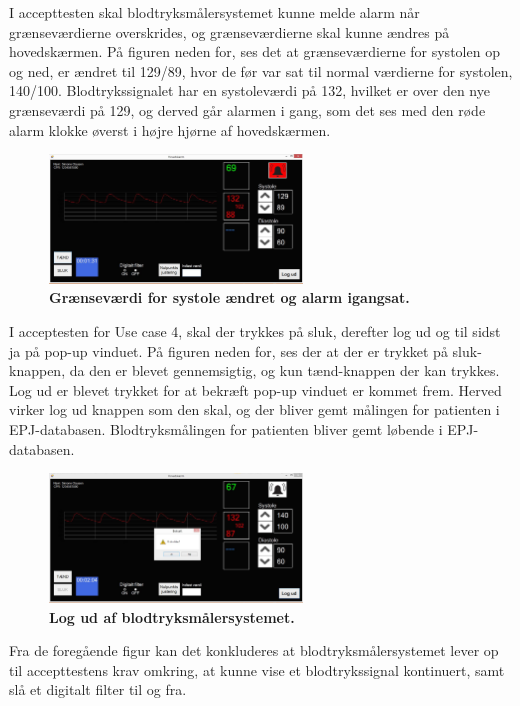 I accepttesten skal blodtryksmålersystemet kunne melde alarm når grænseværdierne overskrides, og grænseværdierne skal kunne ændres på hovedskærmen. På figuren neden for, ses det at grænseværdierne for systolen op og ned, er ændret til 129/89, hvor de før var sat til normal værdierne for systolen, 140/100. Blodtrykssignalet har en systoleværdi på 132, hvilket er over den nye grænseværdi på 129, og derved går alarmen i gang, som det ses med den røde alarm klokke øverst i højre hjørne af hovedskærmen. 
\begin{figure}[H]
\includegraphics[width =0.6\textwidth , center]{billeder/IThovedGUIAlarm}
\caption{\textbf{Grænseværdi for systole ændret og alarm igangsat.}}
\end{figure}
I acceptesten for Use case 4, skal der trykkes på sluk, derefter log ud og til sidst ja på pop-up vinduet. På figuren neden for, ses der at der er trykket på sluk-knappen, da den er blevet gennemsigtig, og kun tænd-knappen der kan trykkes. Log ud er blevet trykket for at bekræft pop-up vinduet er kommet frem. Herved virker log ud knappen som den skal, og der bliver gemt målingen for patienten i EPJ-databasen. Blodtryksmålingen for patienten bliver gemt løbende i EPJ-databasen. 
\begin{figure}[H]
\includegraphics[width =0.6\textwidth , center]{billeder/IThovedGUILogUd}
\caption{\textbf{Log ud af blodtryksmålersystemet.}}
\end{figure}
Fra de foregående figur kan det konkluderes at blodtryksmålersystemet lever op til accepttestens krav omkring, at kunne vise et blodtrykssignal kontinuert, samt slå et digitalt filter til og fra. \\\\
